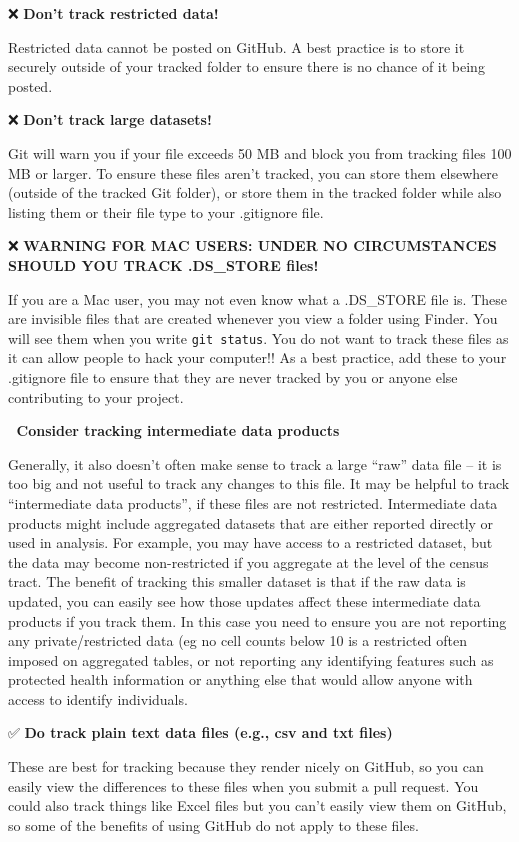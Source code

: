 \documentclass[
]{book}
\begin{document}
❌ \textbf{Don't track restricted data!}

Restricted data cannot be posted on GitHub. A best practice is to store it
securely outside of your tracked folder to ensure there is no chance of it being
posted.

❌ \textbf{Don't track large datasets!}

Git will warn you if your file exceeds 50 MB and
block you from tracking files 100 MB or larger. To ensure these files aren't tracked, you can store them elsewhere (outside of
the tracked Git folder), or store them in the tracked folder while also listing them or their file type to your .gitignore file.

❌ \textbf{WARNING FOR MAC USERS: UNDER NO CIRCUMSTANCES SHOULD YOU TRACK .DS\_STORE files!}

If you are a Mac user, you may not even know what a .DS\_STORE file is. These are
invisible files that are created whenever you view a folder using Finder. You
will see them when you write \texttt{git\ status}. You do not want to track these files
as it can allow people to hack your computer!! As a best practice, add these
to your .gitignore file to ensure that they are never tracked by you or anyone
else contributing to your project.

🤔 \textbf{Consider tracking intermediate data products}

Generally, it also doesn't often make sense to track a large ``raw'' data file -- it is too big and not useful to track any changes to this file. It may be helpful to track ``intermediate data products'', if these files are not restricted. Intermediate data products might include aggregated datasets that are either reported directly or used in analysis. For example, you may have access to a restricted dataset, but the data may become non-restricted if you aggregate at the level of the census tract. The benefit of tracking this smaller dataset is that if the raw data is updated, you can easily see how those updates affect these intermediate data products if you track them. In this case you need to ensure you are not reporting any private/restricted data (eg no cell counts below 10 is a restricted often imposed on aggregated tables, or not reporting any identifying features such as protected health information or anything else that would allow anyone with access to identify
individuals.

✅ \textbf{Do track plain text data files (e.g., csv and txt files) }

These are best for tracking because they render nicely on GitHub, so you can
easily view the differences to these files when you submit a pull request. You
could also track things like Excel files but you can't easily view them on
GitHub, so some of the benefits of using GitHub do not apply to these files.
\end{document}

